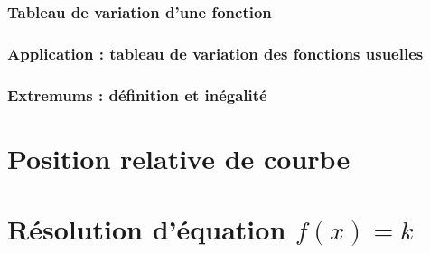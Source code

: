 \documentclass[11pt]{article}
\begin{document}
\subsubsection{Tableau de variation d'une fonction}
\label{sec:orgcf9ecee}
\subsubsection{Application : tableau de variation des fonctions usuelles}
\label{sec:orgf6fbc5f}
\subsubsection{Extremums : définition et inégalité}
\label{sec:org7954d13}
\section{Position relative de courbe}
\label{sec:org69a8c4c}
\section{Résolution d'équation \(f(x) = k\)}
\label{sec:org9ec5ded}
\end{document}
